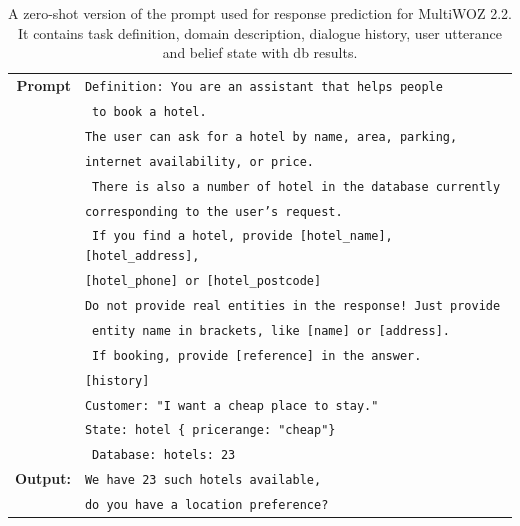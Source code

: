 \begin{table}[tp]
    \centering\small
    \begin{tabular}{rl}
      \toprule
      \textbf{Prompt} & \texttt{{\color{cyan!80!yellow!80!black!100 }Definition: You are an assistant that helps people}} \\
      & \texttt{{\color{cyan!80!yellow!80!black!100} to book a hotel.}} \\
& \texttt{{\color{green!100!yellow!70!black!100 }The user can ask for a hotel by name, area, parking, }}\\
& \texttt{{\color{green!100!yellow!70!black!100 }internet availability, or price.}} \\
& \texttt{{\color{green!100!yellow!70!black!100 } There is also a number of hotel in the database currently }} \\
& \texttt{{\color{green!100!yellow!70!black!100 }corresponding to the user's request. }}\\
& \texttt{{\color{green!100!yellow!70!black!100 } If you find a hotel, provide [hotel\_name], [hotel\_address], }} \\
& \texttt{{\color{green!100!yellow!70!black!100 }[hotel\_phone] or [hotel\_postcode]}} \\
& \texttt{{\color{green!100!yellow!70!black!100 }Do not provide real entities in the response! Just provide}}\\
& \texttt{{\color{green!100!yellow!70!black!100 } entity name in brackets, like [name] or [address].} }\\
& \texttt{{\color{cyan!80!yellow!80!black!100 } If booking, provide [reference] in the answer. }} \\
& \texttt{{\color{red!100!yellow!70!black!100!}[history] }} \\
& \texttt{{\color{orange!50!yellow!90!black!100!}Customer: "I want a cheap place to stay." }}\\
& \texttt{{\color{magenta!100!yellow!70!black!100!}State: hotel \{ pricerange: "cheap"\} }} \\
& \texttt{{\color{magenta!100!yellow!70!black!100!} Database: hotels: 23 }}\\
      \midrule
      \textbf{Output:} & \texttt{We have 23 such hotels available,} \\
      & \texttt{do you have a location preference?} \\
      \bottomrule
  \end{tabular}
  \caption{A zero-shot version of the prompt used for response prediction for MultiWOZ 2.2.
  It contains {\color{cyan!80!yellow!80!black!100} task definition},  {\color{green!100!yellow!70!black!100!}domain description}, {\color{red!100!yellow!70!black!100!} dialogue history}, {\color{orange!50!yellow!90!black!100!} user utterance} and {\color{magenta!100!yellow!70!black!100!} belief state with db results}.}
  \label{07_tab:zero-shot-response}
\end{table}
